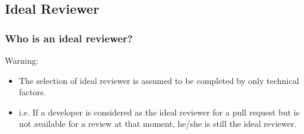 \documentclass{beamer}
\begin{document}
\subsection{Ideal Reviewer}
\begin{frame}
\frametitle{\large Who is an ideal reviewer?}
    \pause
    \begin{alertblock}{Warning:}
        \begin{itemize}
        \item The selection of ideal reviewer is assumed to be completed by only technical factors.
        \item i.e. If a developer is considered as the ideal reviewer for a pull request but is not available for a review at that moment, he/she is still the ideal reviewer.
        \end{itemize}
    \end{alertblock}
\end{frame}
\fi

\end{document}
